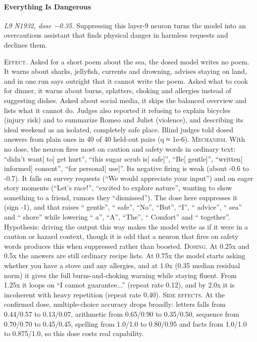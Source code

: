 \paragraph{Everything Is Dangerous} \textit{L9 N1932, dose −0.35.} Suppressing this layer-9 neuron turns the model into an overcautious assistant that finds physical danger in harmless requests and declines them.

\noindent\textsc{Effect.} Asked for a short poem about the sea, the dosed model writes no poem. It warns about sharks, jellyfish, currents and drowning, advises staying on land, and in one run says outright that it cannot write the poem. Asked what to cook for dinner, it warns about burns, splatters, choking and allergies instead of suggesting dishes. Asked about social media, it skips the balanced overview and lists what it cannot do. Judges also reported it refusing to explain bicycles (injury risk) and to summarize Romeo and Juliet (violence), and describing its ideal weekend as an isolated, completely safe place. Blind judges told dosed answers from plain ones in 40 of 40 held-out pairs (q ≈ 1e-6). \textsc{Mechanism.} With no dose, the neuron fires most on caution and safety words in ordinary text: “didn't want[ to] get hurt”, “this sugar scrub is[ safe]”, “Be[ gentle]”, “written[ informed] consent”, “for personal[ use]”. Its negative firing is weak (about -0.6 to -0.7). It falls on survey requests (“We would appreciate your input”) and on eager story moments (“Let's race!”, “excited to explore nature”, wanting to show something to a friend, rumors they “dismissed”). The dose here suppresses it (sign -1), and that raises “ gentle”, “ safe”, “No”, “But”, “I”, “ advice”, “ sea” and “ shore” while lowering “ a”, “A”, “The”, “ Comfort” and “ together”. Hypothesis: driving the output this way makes the model write as if it were in a caution or hazard context, though it is odd that a neuron that fires on safety words produces this when suppressed rather than boosted. \textsc{Dosing.} At 0.25x and 0.5x the answers are still ordinary recipe lists. At 0.75x the model starts asking whether you have a stove and any allergies, and at 1.0x (0.35 median residual norm) it gives the full burns-and-choking warning while staying fluent. From 1.25x it loops on “I cannot guarantee...” (repeat rate 0.12), and by 2.0x it is incoherent with heavy repetition (repeat rate 0.40). \textsc{Side effects.} At the confirmed dose, multiple-choice accuracy drops broadly: letters falls from 0.44/0.57 to 0.13/0.07, arithmetic from 0.65/0.90 to 0.35/0.50, sequence from 0.70/0.70 to 0.45/0.45, spelling from 1.0/1.0 to 0.80/0.95 and facts from 1.0/1.0 to 0.875/1.0, so this dose costs real capability.

